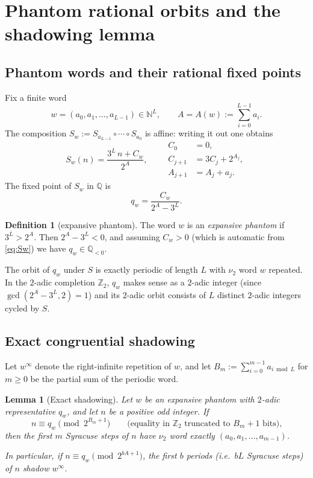 \documentclass[11pt,a4paper]{article}
\newtheorem{lemma}[theorem]{Lemma}
\theoremstyle{definition}
\newtheorem{definition}[theorem]{Definition}
\newcommand{\Zp}{\mathbb{Z}_2}
\newcommand{\Q}{\mathbb{Q}}
\newcommand{\N}{\mathbb{N}}
\begin{document}
\section{Phantom rational orbits and the shadowing lemma}
\label{sec:shadowing}

\subsection{Phantom words and their rational fixed points}

Fix a finite word
\[
w = (a_0, a_1, \ldots, a_{L-1}) \in \N^L,
\qquad
A = A(w) := \sum_{i=0}^{L-1} a_i.
\]
The composition $S_w := S_{a_{L-1}} \circ \cdots \circ S_{a_0}$ is
affine: writing it out one obtains
\begin{equation}\label{eq:Sw}
S_w(n) = \frac{3^L\, n + C_w}{2^A},
\qquad
\begin{aligned}
C_0 &= 0, \\
C_{j+1} &= 3 C_j + 2^{A_j}, \\
A_{j+1} &= A_j + a_j.
\end{aligned}
\end{equation}
The fixed point of $S_w$ in $\Q$ is
\begin{equation}\label{eq:qw}
q_w = \frac{C_w}{2^A - 3^L}.
\end{equation}

\begin{definition}[expansive phantom]
The word $w$ is an \emph{expansive phantom} if $3^L > 2^A$. Then
$2^A - 3^L < 0$, and assuming $C_w > 0$ (which is automatic from
\eqref{eq:Sw}) we have $q_w \in \Q_{<0}$.
\end{definition}

The orbit of $q_w$ under $S$ is exactly periodic of length $L$ with
$\nu_2$ word $w$ repeated. In the $2$-adic completion $\Zp$, $q_w$
makes sense as a $2$-adic integer (since $\gcd(2^A - 3^L, 2)=1$) and
its $2$-adic orbit consists of $L$ distinct $2$-adic integers cycled
by $S$.

\subsection{Exact congruential shadowing}

Let $w^\infty$ denote the right-infinite repetition of $w$, and let
$B_m := \sum_{i=0}^{m-1} a_{i \bmod L}$ for $m \ge 0$ be the partial
sum of the periodic word.

\begin{lemma}[Exact shadowing]\label{lem:shadowing}
Let $w$ be an expansive phantom with $2$-adic representative $q_w$,
and let $n$ be a positive odd integer. If
\[
n \equiv q_w \pmod{2^{B_m+1}}
\qquad\text{(equality in $\Zp$ truncated to $B_m+1$ bits),}
\]
then the first $m$ Syracuse steps of $n$ have $\nu_2$ word exactly
$(a_0, a_1, \ldots, a_{m-1})$.

In particular, if $n \equiv q_w \pmod{2^{bA+1}}$, the first $b$
periods (i.e.\ $bL$ Syracuse steps) of $n$ shadow $w^\infty$.
\end{lemma}
\end{document}
